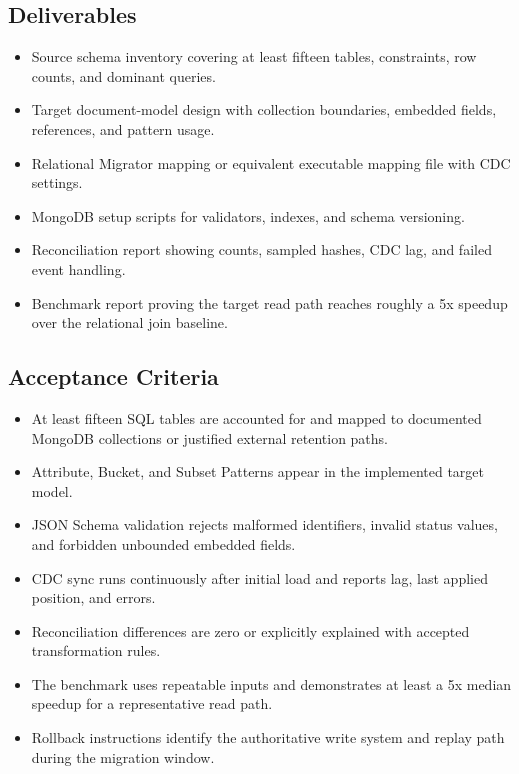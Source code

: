 \subsection*{Deliverables}
\begin{itemize}
    \item Source schema inventory covering at least fifteen tables, constraints, row counts, and dominant queries.
    \item Target document-model design with collection boundaries, embedded fields, references, and pattern usage.
    \item Relational Migrator mapping or equivalent executable mapping file with CDC settings.
    \item MongoDB setup scripts for validators, indexes, and schema versioning.
    \item Reconciliation report showing counts, sampled hashes, CDC lag, and failed event handling.
    \item Benchmark report proving the target read path reaches roughly a 5x speedup over the relational join baseline.
\end{itemize}

\subsection*{Acceptance Criteria}
\begin{itemize}
    \item At least fifteen SQL tables are accounted for and mapped to documented MongoDB collections or justified external retention paths.
    \item Attribute, Bucket, and Subset Patterns appear in the implemented target model.
    \item JSON Schema validation rejects malformed identifiers, invalid status values, and forbidden unbounded embedded fields.
    \item CDC sync runs continuously after initial load and reports lag, last applied position, and errors.
    \item Reconciliation differences are zero or explicitly explained with accepted transformation rules.
    \item The benchmark uses repeatable inputs and demonstrates at least a 5x median speedup for a representative read path.
    \item Rollback instructions identify the authoritative write system and replay path during the migration window.
\end{itemize}

